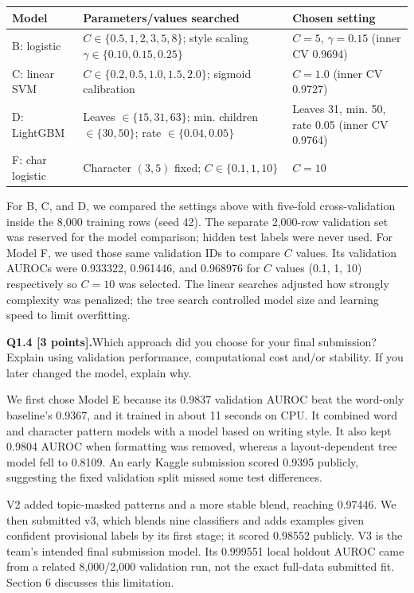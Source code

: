 \documentclass[11pt,letterpaper]{article}
\newcommand{\question}[2]{\needspace{4\baselineskip}\par\addvspace{0.45em}\noindent\textbf{#1}\quad #2\par\nobreak\vspace{0.1em}}
\begin{document}
\begin{tabularx}{\linewidth}{@{}p{1.18in}Yp{1.38in}@{}}\toprule Model & Parameters/values searched & Chosen setting \\ \midrule
B: logistic & $C\in\{0.5,1,2,3,5,8\}$; style scaling $\gamma\in\{0.10,0.15,0.25\}$ & $C=5$, $\gamma=0.15$ (inner CV 0.9694) \\
C: linear SVM & $C\in\{0.2,0.5,1.0,1.5,2.0\}$; sigmoid calibration & $C=1.0$ (inner CV 0.9727) \\
D: LightGBM & Leaves $\in\{15,31,63\}$; min. children $\in\{30,50\}$; rate $\in\{0.04,0.05\}$ & Leaves 31, min. 50, rate 0.05 (inner CV 0.9764) \\
F: char logistic & Character $(3,5)$ fixed; $C\in\{0.1,1,10\}$ & $C=10$ \\
\bottomrule\end{tabularx}
\newline

For B, C, and D, we compared the settings above with five-fold cross-validation inside the 8,000 training rows (seed 42). The separate 2,000-row validation set was reserved for the model comparison; hidden test labels were never used. For Model F, we used those same validation IDs to compare $C$ values. Its validation AUROCs were 0.933322, 0.961446, and 0.968976 for $C$ values (0.1, 1, 10) respectively so $C=10$ was selected. The linear searches adjusted how strongly complexity was penalized; the tree search controlled model size and learning speed to limit overfitting.
\question{Q1.4 [3 points].}{Which approach did you choose for your final submission? Explain using validation performance, computational cost and/or stability. If you later changed the model, explain why.}
We first chose Model E because its 0.9837 validation AUROC beat the word-only baseline's 0.9367, and it trained in about 11 seconds on CPU. It combined word and character pattern models with a model based on writing style. It also kept 0.9804 AUROC when formatting was removed, whereas a layout-dependent tree model fell to 0.8109. An early Kaggle submission scored 0.9395 publicly, suggesting the fixed validation split missed some test differences.
\newline

V2 added topic-masked patterns and a more stable blend, reaching 0.97446. We then submitted v3, which blends nine classifiers and adds examples given confident provisional labels by its first stage; it scored 0.98552 publicly. V3 is the team's intended final submission model. Its 0.999551 local holdout AUROC came from a related 8,000/2,000 validation run, not the exact full-data submitted fit. Section 6 discusses this limitation.
\end{document}
